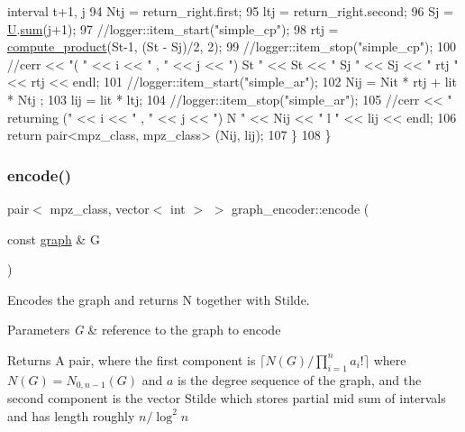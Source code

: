 \begin{DoxyCode}
{       interval t+1, j}
94     Ntj = return\_right.first;
95     ltj = return\_right.second;
96     Sj = \hyperlink{classgraph__encoder_a3314c40920f2ee132958a6b0ce7e7995}{U}.\hyperlink{classreverse__fenwick__tree_a672731fd6395b4853430073a099a80e6}{sum}(j+1);
97     \textcolor{comment}{//logger::item\_start("simple\_cp"); }
98     rtj = \hyperlink{compression__helper_8cpp_ae2afb43aabe50f7d42aae8f82b5a35f4}{compute\_product}(St-1, (St - Sj)/2, 2);
99     \textcolor{comment}{//logger::item\_stop("simple\_cp");}
100     \textcolor{comment}{//cerr << "( " << i << " , " << j << ") St " << St << " Sj " << Sj << " rtj " << rtj << endl;}
101     \textcolor{comment}{//logger::item\_start("simple\_ar");}
102     Nij = Nit * rtj + lit * Ntj ;
103     lij = lit * ltj;
104     \textcolor{comment}{//logger::item\_stop("simple\_ar");}
105     \textcolor{comment}{//cerr << " returning (" << i << " , " << j << ") N " << Nij << " l " << lij << endl;}
106     \textcolor{keywordflow}{return} pair<mpz\_class, mpz\_class> (Nij, lij);
107   \}
108 \}
\end{DoxyCode}
\mbox{\label{classgraph__encoder_a23350e4c0986763b24d14c5ef1beb37e}} 
\subsubsection{\texorpdfstring{encode()}{encode()}}
{\footnotesize\ttfamily pair$<$ mpz\+\_\+class, vector$<$ int $>$ $>$ graph\+\_\+encoder\+::encode (\begin{DoxyParamCaption}\item[{const \hyperlink{classgraph}{graph} \&}]{G }\end{DoxyParamCaption})}



Encodes the graph and returns N together with Stilde. 


\begin{DoxyParams}{Parameters}
{\em G} & reference to the graph to encode \\
\hline
\end{DoxyParams}
\begin{DoxyReturn}{Returns}
A pair, where the first component is $\lceil N(G) / \prod_{i=1}^n a_i! \rceil$ where $N(G) = N_{0,n-1}(G)$ and $a$ is the degree sequence of the graph, and the second component is the vector Stilde which stores partial mid sum of intervals and has length roughly $n / \log^2 n$ 
\end{DoxyReturn}

